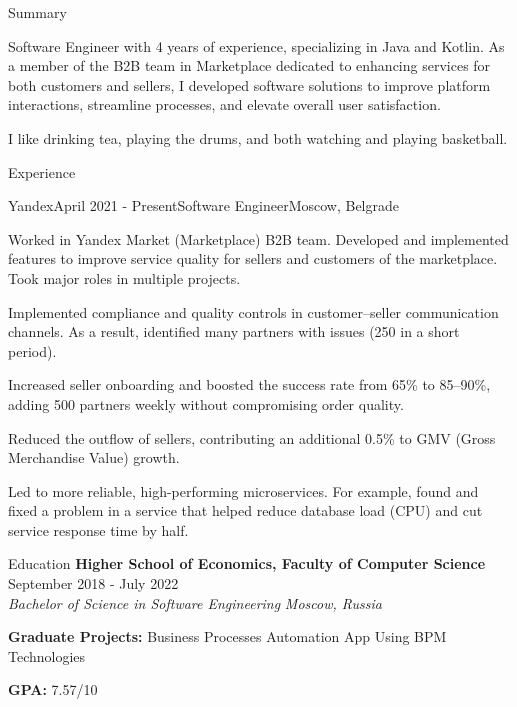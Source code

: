 \documentclass[
	11pt, %
]{resume} %
\begin{document}
	
\begin{rSection}{Summary}
	
Software Engineer with 4 years of experience, specializing in Java and Kotlin. As a member of the B2B team in Marketplace dedicated to enhancing services for both customers and sellers, I developed software solutions to improve platform interactions, streamline processes, and elevate overall user satisfaction.

I like drinking tea, playing the drums, and both watching and playing basketball.
\end{rSection}

\begin{rSection}{Experience}

\begin{rSubsection}{Yandex}{April 2021 - Present}{Software Engineer}{Moscow, Belgrade}
	\item Worked in Yandex Market (Marketplace) B2B team. Developed and implemented features to improve service quality for sellers and customers of the marketplace. Took major roles in multiple projects.
	\item Implemented compliance and quality controls in customer–seller communication channels. As a result, identified many partners with issues (250 in a short period).
	\item Increased seller onboarding and boosted the success rate from 65\% to 85–90\%, adding 500 partners weekly without compromising order quality.
	\item Reduced the outflow of sellers, contributing an additional 0.5\% to GMV (Gross Merchandise Value) growth.
	\item Led to more reliable, high-performing microservices. For example, found and fixed a problem in a service that helped reduce database load (CPU) and cut service response time by half.
\end{rSubsection}
\end{rSection}

\begin{rSection}{Education}
	\textbf{Higher School of Economics, Faculty of Computer Science} \hfill {September 2018 - July 2022} \\
	\textit{Bachelor of Science in Software Engineering} \hfill \textit{Moscow, Russia}
	
	\textbf{Graduate Projects:} Business Processes Automation App Using BPM Technologies
	
	\textbf{GPA:} 7.57/10
\end{rSection}
\end{document}

